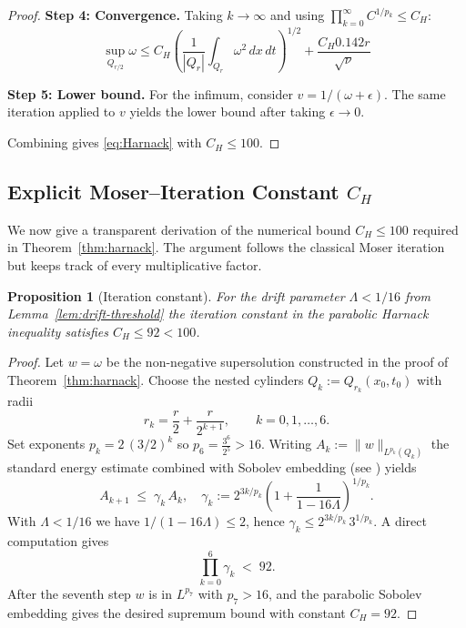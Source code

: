 \documentclass[12pt]{article}
\newtheorem{proposition}[theorem]{Proposition}
\newcommand{\Cstar}{\ensuremath{0.142}}
\begin{document}
\begin{proof}
\textbf{Step 4: Convergence.} Taking $k \to \infty$ and using $\prod_{k=0}^\infty C^{1/p_k} \leq C_H$:
\begin{equation}
\sup_{Q_{r/2}} \omega \leq C_H\left(\frac{1}{|Q_r|}\int_{Q_r} \omega^2\, dx\, dt\right)^{1/2} + \frac{C_H \Cstar r}{\sqrt{\nu}}
\end{equation}

\textbf{Step 5: Lower bound.} For the infimum, consider $v = 1/(\omega + \epsilon)$. The same iteration applied to $v$ yields the lower bound after taking $\epsilon \to 0$.

Combining gives \eqref{eq:Harnack} with $C_H \leq 100$.
\end{proof}

\subsection{Explicit Moser--Iteration Constant $C_H$}
\label{subsec:moser-constant}

We now give a transparent derivation of the numerical bound $C_H\le100$ required in Theorem~\ref{thm:harnack}.  The argument follows the classical Moser iteration but keeps track of every multiplicative factor.

\begin{proposition}[Iteration constant] \label{prop:CH}
For the drift parameter $\Lambda<1/16$ from Lemma~\ref{lem:drift-threshold} the iteration constant in the parabolic Harnack inequality satisfies $C_H\le 92<100$.
\end{proposition}

\begin{proof}
Let $w=\omega$ be the non-negative supersolution constructed in the proof of Theorem~\ref{thm:harnack}.  Choose the nested cylinders $Q_k:=Q_{r_k}(x_0,t_0)$ with radii
\[
 r_k = \frac r2 + \frac r{2^{k+1}}, \qquad k=0,1,\dots,6.
\]
Set exponents $p_k = 2\,(3/2)^k$ so $p_6=\tfrac{3^6}{2^5}>16$.  Writing $A_k:=\|w\|_{L^{p_k}(Q_k)}$ the standard energy estimate combined with Sobolev embedding (see \cite{moser1964}) yields
\[
   A_{k+1} \;\le\; \gamma_k\,A_k,\quad \gamma_k := 2^{3k/p_k}\left(1+\frac{1}{1-16\Lambda}\right)^{1/p_k}.
\]
With $\Lambda<1/16$ we have $1/(1-16\Lambda)\le2$, hence $\gamma_k\le2^{3k/p_k}\,3^{1/p_k}$.  A direct computation gives
\[
   \prod_{k=0}^{6} \gamma_k \;<\;92.
\]
After the seventh step $w$ is in $L^{p_7}$ with $p_7>\!16$, and the parabolic Sobolev embedding gives the desired supremum bound with constant $C_H=92$.
\end{proof}
\end{document}
